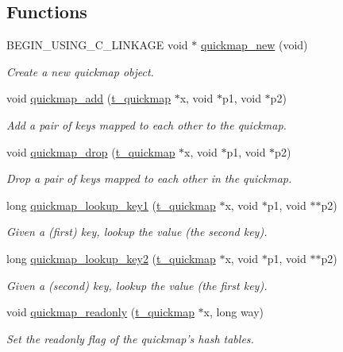 \subsection*{Functions}
\begin{DoxyCompactItemize}
\item 
BEGIN\_\-USING\_\-C\_\-LINKAGE void $\ast$ \hyperlink{group__quickmap_ga0e14465f864438dc36f86dcd8bc4cea0}{quickmap\_\-new} (void)
\begin{DoxyCompactList}\small\item\em Create a new quickmap object. \item\end{DoxyCompactList}\item 
void \hyperlink{group__quickmap_ga4fd087f1aa587108d26d5a377efb0d0b}{quickmap\_\-add} (\hyperlink{structt__quickmap}{t\_\-quickmap} $\ast$x, void $\ast$p1, void $\ast$p2)
\begin{DoxyCompactList}\small\item\em Add a pair of keys mapped to each other to the quickmap. \item\end{DoxyCompactList}\item 
void \hyperlink{group__quickmap_ga4bcc531dc606835a05358aa4ca0f92d1}{quickmap\_\-drop} (\hyperlink{structt__quickmap}{t\_\-quickmap} $\ast$x, void $\ast$p1, void $\ast$p2)
\begin{DoxyCompactList}\small\item\em Drop a pair of keys mapped to each other in the quickmap. \item\end{DoxyCompactList}\item 
long \hyperlink{group__quickmap_ga2320c067e7af6bb5f3ec25cfe3155fd1}{quickmap\_\-lookup\_\-key1} (\hyperlink{structt__quickmap}{t\_\-quickmap} $\ast$x, void $\ast$p1, void $\ast$$\ast$p2)
\begin{DoxyCompactList}\small\item\em Given a (first) key, lookup the value (the second key). \item\end{DoxyCompactList}\item 
long \hyperlink{group__quickmap_ga5b3d684268e80a4fc51e226a50ecb2ad}{quickmap\_\-lookup\_\-key2} (\hyperlink{structt__quickmap}{t\_\-quickmap} $\ast$x, void $\ast$p1, void $\ast$$\ast$p2)
\begin{DoxyCompactList}\small\item\em Given a (second) key, lookup the value (the first key). \item\end{DoxyCompactList}\item 
void \hyperlink{group__quickmap_gaa5c0fc50afb5b1dccd6b81e7dd0673c1}{quickmap\_\-readonly} (\hyperlink{structt__quickmap}{t\_\-quickmap} $\ast$x, long way)
\begin{DoxyCompactList}\small\item\em Set the readonly flag of the quickmap's hash tables. \item\end{DoxyCompactList}\end{DoxyCompactItemize}


